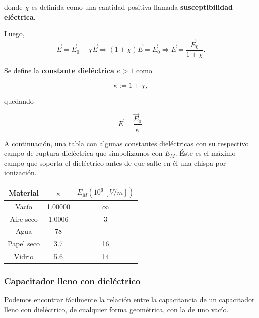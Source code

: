 donde $\chi$ es definida como una cantidad positiva llamada \textbf{susceptibilidad eléctrica}.

Luego,
$$\vec{E} = \vec{E}_0 - \chi \vec{E} \Rightarrow  (1+\chi)\vec{E} = \vec{E}_0 \Rightarrow  \vec{E} = \frac{\vec{E}_0}{1+\chi}.$$

Se define la \textbf{constante dieléctrica} $\kappa > 1$ como
\begin{shaded}
$$\kappa := 1 + \chi,$$    
\end{shaded}

quedando
\begin{shaded}
  $$\vec{E} = \frac{\vec{E}_0}{\kappa}.$$  
\end{shaded}

A continuación, una tabla con algunas constantes dieléctricas con su respectivo campo de ruptura dieléctrica que simbolizamos con $E_M$. Éste es el máximo campo que soporta el dieléctrico antes de que salte en él una chispa por ionización.

\begin{center}
\begin{tabular}{|c|c|c|}
\hline 
Material & $\kappa$ & $E_M (10^6 \,[V/m])$ \\
\hline 
Vacío & 1.00000 & $\infty$ \\
Aire seco &  1.0006 & 3 \\
Agua & 78 & --- \\
Papel seco & 3.7 & 16 \\
Vidrio & 5.6 & 14 \\
\hline
\end{tabular}
\end{center}

\subsubsection{Capacitador lleno con dieléctrico}

Podemos encontrar fácilmente la relación entre la capacitancia de un capacitador lleno con dieléctrico, de cualquier forma geométrica, con la de uno vacío.

